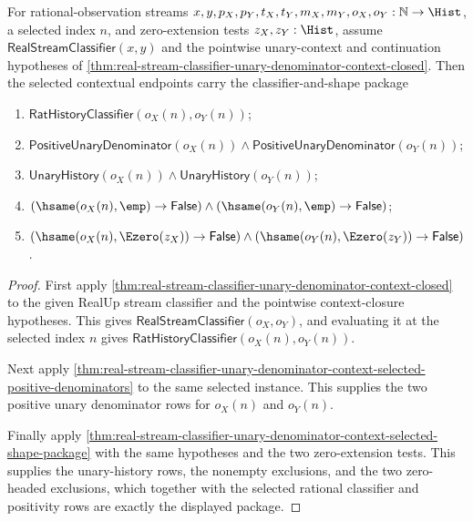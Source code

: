 \begin{theorem}
\label{thm:real-stream-classifier-unary-denominator-context-selected-classifier-shape-package}
For rational-observation streams
$x,y,p_X,p_Y,t_X,t_Y,m_X,m_Y,o_X,o_Y:\mathbb{N}\to\Hist$, a selected
index $n$, and zero-extension tests $z_X,z_Y:\Hist$, assume
$\mathsf{RealStreamClassifier}(x,y)$ and the pointwise unary-context and
continuation hypotheses of
\autoref{thm:real-stream-classifier-unary-denominator-context-closed}. Then
the selected contextual endpoints carry the classifier-and-shape package
\begin{enumerate}
\item $\mathsf{RatHistoryClassifier}(o_X(n),o_Y(n))$;
\item $\mathsf{PositiveUnaryDenominator}(o_X(n))\land
\mathsf{PositiveUnaryDenominator}(o_Y(n))$;
\item $\mathsf{UnaryHistory}(o_X(n))\land\mathsf{UnaryHistory}(o_Y(n))$;
\item $(\hsame(o_X(n),\emp)\to\mathsf{False})\land
(\hsame(o_Y(n),\emp)\to\mathsf{False})$;
\item $(\hsame(o_X(n),\Ezero(z_X))\to\mathsf{False})\land
(\hsame(o_Y(n),\Ezero(z_Y))\to\mathsf{False})$.
\end{enumerate}
\end{theorem}
\begin{proof}
First apply
\autoref{thm:real-stream-classifier-unary-denominator-context-closed} to the
given RealUp stream classifier and the pointwise context-closure hypotheses.
This gives $\mathsf{RealStreamClassifier}(o_X,o_Y)$, and evaluating it at the
selected index $n$ gives
$\mathsf{RatHistoryClassifier}(o_X(n),o_Y(n))$.

Next apply
\autoref{thm:real-stream-classifier-unary-denominator-context-selected-positive-denominators}
to the same selected instance. This supplies the two positive unary denominator
rows for $o_X(n)$ and $o_Y(n)$.

Finally apply
\autoref{thm:real-stream-classifier-unary-denominator-context-selected-shape-package}
with the same hypotheses and the two zero-extension tests. This supplies the
unary-history rows, the nonempty exclusions, and the two zero-headed exclusions,
which together with the selected rational classifier and positivity rows are
exactly the displayed package.
\end{proof}

